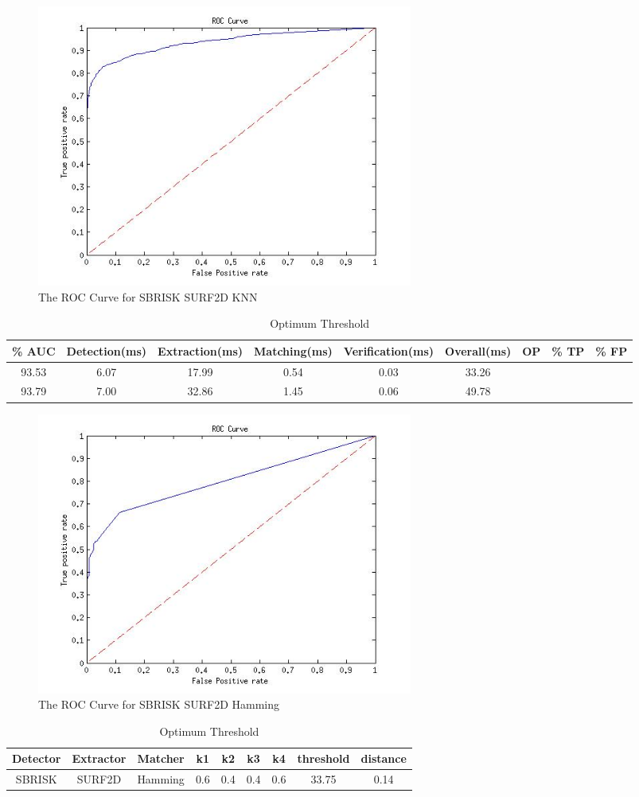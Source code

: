 \documentclass{article}
\begin{document}
\begin{figure}[h!]
	\centering
		\includegraphics[width=0.6\textwidth]{../Drawings/ROC_SBRISK_SURF2D_KNN.jpg}
	\caption{The ROC Curve for SBRISK SURF2D KNN}
	\label{fig:sbriskroc}
\end{figure}


\begin{table}
\caption{Optimum Threshold}
\begin{tabular}{|c|c|c|c|c|c|c|c|c|}
\hline 
\% AUC & Detection(ms) & Extraction(ms) & Matching(ms) & Verification(ms) & Overall(ms) & OP & \% TP & \% FP\tabularnewline
\hline 
\hline 
93.53 & 6.07 & 17.99 & 0.54 & 0.03 & 33.26 &  &  & \tabularnewline
\hline 
93.79 & 7.00 & 32.86 & 1.45 & 0.06 & 49.78 &  &  & \tabularnewline
\hline 
\end{tabular}
\end{table}
\begin{figure}[h!]
	\centering
		\includegraphics[width=0.6\textwidth]{../Drawings/ROC_SBRISK_SURF2D_Hamming.jpg}
	\caption{The ROC Curve for SBRISK SURF2D Hamming}
	\label{fig:sbriskroc}
\end{figure}


\begin{table}
\caption{Optimum Threshold}
\begin{tabular}{|c|c|c|c|c|c|c|c|c|}
\hline 
Detector & Extractor & Matcher & k1 & k2 & k3 & k4 & threshold & distance\tabularnewline
\hline 
\hline 
SBRISK & SURF2D & Hamming & 0.6 & 0.4 & 0.4 & 0.6 & 33.75 & 0.14\tabularnewline
\hline 
\end{tabular}
\label{tab:sbrisk}
\end{table}
\end{document}
